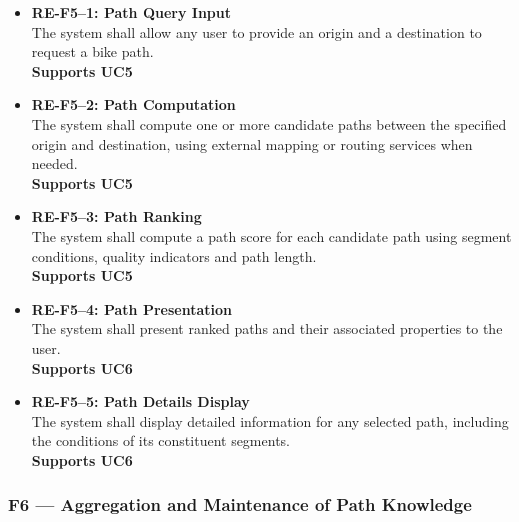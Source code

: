 \begin{itemize}

    \item \textbf{RE-F5--1: Path Query Input}\label{req:RE-F5-1}\\
    The system shall allow any user to provide an origin and a destination to request a bike path.\\
    \textbf{Supports UC5}

    \item \textbf{RE-F5--2: Path Computation}\label{req:RE-F5-2}\\
    The system shall compute one or more candidate paths between the specified origin 
    and destination, using external mapping or routing services when needed.\\
    \textbf{Supports UC5}

    \item \textbf{RE-F5--3: Path Ranking}\label{req:RE-F5-3}\\
    The system shall compute a path score for each candidate path using segment conditions, 
    quality indicators and path length.\\
    \textbf{Supports UC5}

    \item \textbf{RE-F5--4: Path Presentation}\label{req:RE-F5-4}\\
    The system shall present ranked paths and their associated properties to the user.\\
    \textbf{Supports UC6}

    \item \textbf{RE-F5--5: Path Details Display}\label{req:RE-F5-5}\\
    The system shall display detailed information for any selected path, including the 
    conditions of its constituent segments.\\
    \textbf{Supports UC6}

\end{itemize}

\subsubsection*{F6 --- Aggregation and Maintenance of Path Knowledge}\label{sec:F6}

